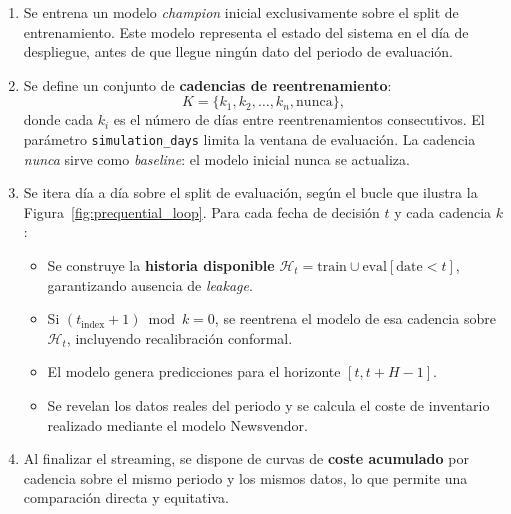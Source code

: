 \begin{enumerate}
    \item Se entrena un modelo \textit{champion} inicial exclusivamente sobre el split de entrenamiento. Este modelo representa el estado del sistema en el día de despliegue, antes de que llegue ningún dato del periodo de evaluación.
    \item Se define un conjunto de \textbf{cadencias de reentrenamiento}:
    \[K = \{k_1, k_2, \ldots, k_n, \text{nunca}\},\]
    donde cada $k_i$ es el número de días entre reentrenamientos consecutivos. El parámetro \texttt{simulation\_\allowbreak{}days} limita la ventana de evaluación. La cadencia \textit{nunca} sirve como \textit{baseline}: el modelo inicial nunca se actualiza.
    \item Se itera día a día sobre el split de evaluación, según el bucle que ilustra la Figura~\ref{fig:prequential_loop}. Para cada fecha de decisión $t$ y cada cadencia $k$:
    \begin{itemize}
        \item Se construye la \textbf{historia disponible} $\mathcal{H}_t = \text{train} \cup \text{eval}[\text{date} < t]$, garantizando ausencia de \textit{leakage}.
        \item Si $(t_{\text{index}} + 1) \bmod k = 0$, se reentrena el modelo de esa cadencia sobre $\mathcal{H}_t$, incluyendo recalibración conformal.
        \item El modelo genera predicciones para el horizonte $[t, t+H-1]$.
        \item Se revelan los datos reales del periodo y se calcula el coste de inventario realizado mediante el modelo Newsvendor.
    \end{itemize}
    \item Al finalizar el streaming, se dispone de curvas de \textbf{coste acumulado} por cadencia sobre el mismo periodo y los mismos datos, lo que permite una comparación directa y equitativa.
\end{enumerate}

